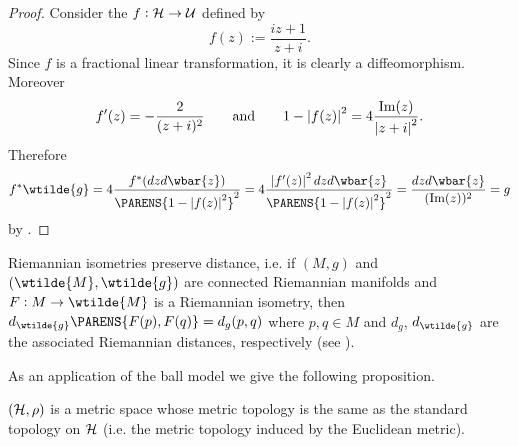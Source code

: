 \begin{proof}
	Consider the  $f : \mathcal{H} \to \mathcal{U}$ defined by 
	\begin{equation}
		f(z) := \frac{iz + 1}{z + i}.
	\end{equation}
	Since $f$ is a fractional linear transformation, it is clearly a diffeomorphism. Moreover
	\begin{equation*}
		f'(z) = -\frac{2}{(z + i)^2} \qquad \text{and} \qquad 1 - \abs[0]{f(z)}^2 = 4\frac{\Im(z)}{\abs[0]{z + i}^2}.	
	\end{equation*}
	Therefore
	\begin{equation*}
		f^*\wtilde{g} = 4 \frac{f^*(dzd\wbar{z})}{\PARENS{1 - \abs[0]{f(z)}^2}^2} = 4 \frac{\abs[0]{f'(z)}^2dzd\wbar{z}}{\PARENS{1 - \abs[0]{f(z)}^2}^2} = \frac{dzd\wbar{z}}{(\Im(z))^2} = g
	\end{equation*}
	\noindent by \cite[41]{lee:Riemannian_manifolds:1997}.
\end{proof}

\begin{remark}
	Riemannian isometries preserve distance, i.e. if $(M,g)$ and $(\wtilde{M},\wtilde{g})$ are connected Riemannian manifolds and $F : M \to \wtilde{M}$ is a Riemannian isometry, then $d_{\wtilde{g}}\PARENS{F(p),F(q)} = d_g(p,q)$ where $p,q \in M$ and $d_g$, $d_{\wtilde{g}}$ are the associated Riemannian distances, respectively (see \cite[338]{lee:smooth_manifolds:2013}).
\end{remark}

As an application of the ball model we give the following proposition.

\begin{proposition}
$(\mathcal{H},\rho)$ is a metric space whose metric topology is the same as the standard topology on $\mathcal{H}$ (i.e. the metric topology induced by the Euclidean metric).
\label{prop:metric}
\end{proposition}

